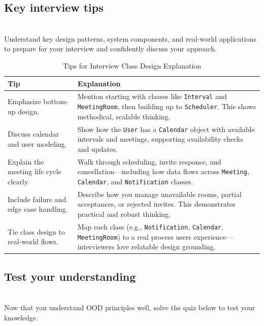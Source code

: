 \subsection{Key interview tips}\label{Key-interview-tips}
\\
Understand key design patterns, system components, and real-world applications to prepare for your interview and confidently discuss your approach.

\begin{table}[h!]
\centering
\begin{tabular}{|p{5cm}|p{10cm}|}
\hline
\textbf{Tip} & \textbf{Explanation} \\
\hline
Emphasize bottom-up design. & Mention starting with classes like \texttt{Interval} and \texttt{MeetingRoom}, then building up to \texttt{Scheduler}. This shows methodical, scalable thinking. \\
\hline
Discuss calendar and user modeling. & Show how the \texttt{User} has a \texttt{Calendar} object with available intervals and meetings, supporting availability checks and updates. \\
\hline
Explain the meeting life cycle clearly. & Walk through scheduling, invite response, and cancellation—including how data flows across \texttt{Meeting}, \texttt{Calendar}, and \texttt{Notification} classes. \\
\hline
Include failure and edge case handling. & Describe how you manage unavailable rooms, partial acceptances, or rejected invites. This demonstrates practical and robust thinking. \\
\hline
Tie class design to real-world flows. & Map each class (e.g., \texttt{Notification}, \texttt{Calendar}, \texttt{MeetingRoom}) to a real process users experience—interviewers love relatable design grounding. \\
\hline
\end{tabular}
\caption{Tips for Interview Class Design Explanation}
\label{tab:class_design_tips}
\end{table}


\subsection{Test your understanding}\label{c10vvXXwg2RIHLlewVtjy}
\\
Now that you understand OOD principles well, solve the quiz below to test your knowledge.

